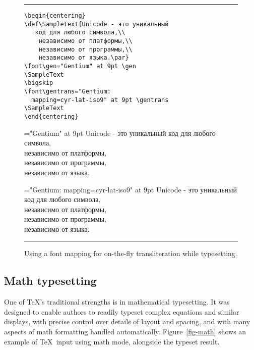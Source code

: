 \documentclass[letterpaper,11pt]{article}
\begin{document}
\begin{figure}[tb]
\hrule\smallskip
\begin{minipage}{0.5\hsize}
\begin{verbatim}
\begin{centering}
\def\SampleText{Unicode - это уникальный
   код для любого символа,\\
    независимо от платформы,\\
    независимо от программы,\\
    независимо от языка.\par}
\font\gen="Gentium" at 9pt \gen
\SampleText
\bigskip
\font\gentrans="Gentium:
  mapping=cyr-lat-iso9" at 9pt \gentrans
\SampleText
\end{centering}
\end{verbatim}
\end{minipage}\hfil
\begin{minipage}{0.5\hsize}
\def\SampleText{Unicode - это уникальный
   код для любого символа,\\
    независимо от платформы,\\
    независимо от программы,\\
    независимо от языка.\par}
\begin{centering}
\font\gen="Gentium" at 9pt \gen
\SampleText
\bigskip
\font\gentrans="Gentium:
  mapping=cyr-lat-iso9" at 9pt \gentrans
\SampleText
\end{centering}
\end{minipage}
\smallskip\hrule
\caption{Using a font mapping for on-the-fly transliteration while typesetting.}
\label{fig-translit}
\end{figure}

\subsection{Math typesetting}

One of \TeX's traditional strengths is in mathematical typesetting. It was designed to enable authors to readily typeset complex equations and similar displays, with precise control over details of layout and spacing, and with many aspects of math formatting handled automatically. Figure~\ref{fig-math} shows an example of \TeX\ input using math mode, alongside the typeset result.
\end{document}
